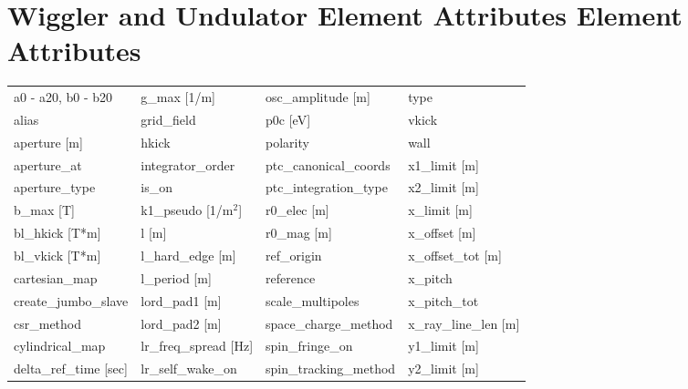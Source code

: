  \section{Wiggler and Undulator Element Attributes Element Attributes}
 \label{s:list.wiggler}
 
 \begin{tabular}{llll} \toprule
a0 - a20, b0 - b20             & g_max [1/m]                    & osc_amplitude [m]              & type                           \\
alias                          & grid_field                     & p0c [eV]                       & vkick                          \\
aperture [m]                   & hkick                          & polarity                       & wall                           \\
aperture_at                    & integrator_order               & ptc_canonical_coords           & x1_limit [m]                   \\
aperture_type                  & is_on                          & ptc_integration_type           & x2_limit [m]                   \\
b_max [T]                      & k1_pseudo [1/m$^2$]            & r0_elec [m]                    & x_limit [m]                    \\
bl_hkick [T*m]                 & l [m]                          & r0_mag [m]                     & x_offset [m]                   \\
bl_vkick [T*m]                 & l_hard_edge [m]                & ref_origin                     & x_offset_tot [m]               \\
cartesian_map                  & l_period [m]                   & reference                      & x_pitch                        \\
create_jumbo_slave             & lord_pad1 [m]                  & scale_multipoles               & x_pitch_tot                    \\
csr_method                     & lord_pad2 [m]                  & space_charge_method            & x_ray_line_len [m]             \\
cylindrical_map                & lr_freq_spread [Hz]            & spin_fringe_on                 & y1_limit [m]                   \\
delta_ref_time [sec]           & lr_self_wake_on                & spin_tracking_method           & y2_limit [m]                   \\

\end{tabular}
